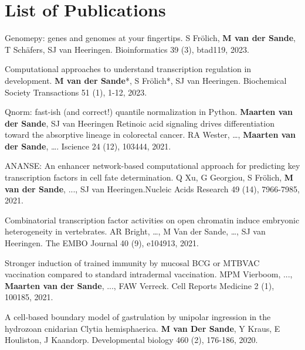 \section{List of Publications}


Genomepy: genes and genomes at your fingertips. S Frölich, \textbf{M van der Sande}, T Schäfers, SJ van Heeringen. Bioinformatics 39 (3), btad119, 2023.

Computational approaches to understand transcription regulation in development. \textbf{M van der Sande}*, S Frölich*, SJ van Heeringen. Biochemical Society Transactions 51 (1), 1-12, 2023.

Qnorm: fast-ish (and correct!) quantile normalization in Python. \textbf{Maarten van der Sande}, SJ van Heeringen
Retinoic acid signaling drives differentiation toward the absorptive lineage in colorectal cancer. RA Wester, \ldots, \textbf{Maarten van der Sande}, \ldots. Iscience 24 (12), 103444, 2021.

ANANSE: An enhancer network-based computational approach for predicting key transcription factors in cell fate determination. Q Xu, G Georgiou, S Frölich, \textbf{M van der Sande}, ..., SJ van Heeringen.Nucleic Acids Research 49 (14), 7966-7985, 2021.

Combinatorial transcription factor activities on open chromatin induce embryonic heterogeneity in vertebrates. AR Bright, \ldots, M Van der Sande, \ldots, SJ van Heeringen. The EMBO Journal 40 (9), e104913, 2021.

Stronger induction of trained immunity by mucosal BCG or MTBVAC vaccination compared to standard intradermal vaccination. MPM Vierboom, ..., \textbf{Maarten van der Sande}, ..., FAW Verreck. Cell Reports Medicine 2 (1), 100185, 2021.

A cell-based boundary model of gastrulation by unipolar ingression in the hydrozoan cnidarian Clytia hemisphaerica. \textbf{M van Der Sande}, Y Kraus, E Houliston, J Kaandorp. Developmental biology 460 (2), 176-186, 2020.
